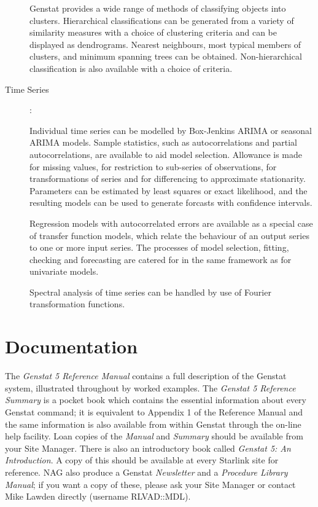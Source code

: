 \begin{description}
Genstat provides a wide range of methods of classifying objects into clusters.
Hierarchical classifications can be generated from a variety of similarity
measures with a choice of clustering criteria and can be displayed as
dendrograms.
Nearest neighbours, most typical members of clusters, and minimum spanning
trees can be obtained.
Non-hierarchical classification is also available with a choice of criteria.

\item[Time Series]:

Individual time series can be modelled by Box-Jenkins ARIMA or seasonal
ARIMA models.
Sample statistics, such as autocorrelations and partial autocorrelations, are
available to aid model selection.
Allowance is made for missing values, for restriction to sub-series of
observations, for transformations of series and for differencing to
approximate stationarity.
Parameters can be estimated by least squares or exact likelihood, and the
resulting models can be used to generate forcasts with confidence
intervals.

Regression models with autocorrelated errors are available as a special case
of transfer function models, which relate the behaviour of an output series to
one or more input series.
The processes of model selection, fitting, checking and forecasting are
catered for in the same framework as for univariate models.

Spectral analysis of time series can be handled by use of Fourier
transformation functions.
\end{description}

\section{Documentation}

The {\em Genstat 5 Reference Manual} contains a full description of the Genstat
system, illustrated throughout by worked examples.
The {\em Genstat 5 Reference Summary} is a pocket book which contains the
essential information about every Genstat command; it is equivalent to
Appendix 1 of the Reference Manual and the same information is also available
from within Genstat through the on-line help facility.
Loan copies of the {\em Manual} and {\em Summary} should be available from your
Site Manager.
There is also an introductory book called {\em Genstat 5: An Introduction}.
A copy of this should be available at every Starlink site for reference.
NAG also produce a Genstat {\em Newsletter} and a {\em Procedure Library
Manual}; if you want a copy of these, please ask your Site Manager or contact
Mike Lawden directly (username RLVAD::MDL).

